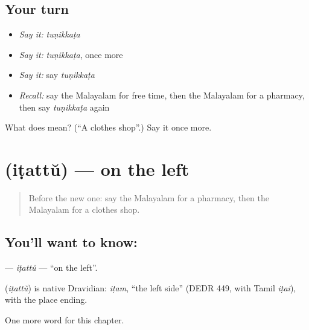 \subsection*{Your turn}
\begin{itemize}
\raggedright
  \item \emph{Say it:} \emph{tuṇikkaṭa}
  \item \emph{Say it:} \emph{tuṇikkaṭa}, once more
  \item \emph{Say it:} say \emph{tuṇikkaṭa}
  \item \emph{Recall:} say the Malayalam for free time, then the Malayalam for a pharmacy, then say \emph{tuṇikkaṭa} again
\end{itemize}

\begin{tcolorbox}[breakable,colback=teal!4,colframe=teal!35!black,title={Before you move on}]
What does  mean? (\textquotedblleft{}A clothes shop\textquotedblright{}.) Say it once more.
\end{tcolorbox}
\section[\texorpdfstring{\ml{ഇടത്ത്} (iṭattŭ)}{ഇടത്ത് (iṭattŭ)}]{ (iṭattŭ) — on the left}

\label{lesson:ML-C197-itattu}



\begin{quote}
Before the new one: say the Malayalam for a pharmacy, then the Malayalam for a clothes shop.
\end{quote}

\subsection*{You'll want to know: }
\textbf{} — \emph{iṭattŭ} — \textquotedblleft{}on the left\textquotedblright{}.

\begin{cousinweb}
\textbf{} (\emph{iṭattŭ}) is native Dravidian: \emph{iṭam}, \textquotedblleft{}the left side\textquotedblright{} (DEDR 449, with Tamil \emph{iṭai}), with the place ending.
\end{cousinweb}

\begin{grammarlens}[title={What you've built}]
One more word for this chapter.
\end{grammarlens}

